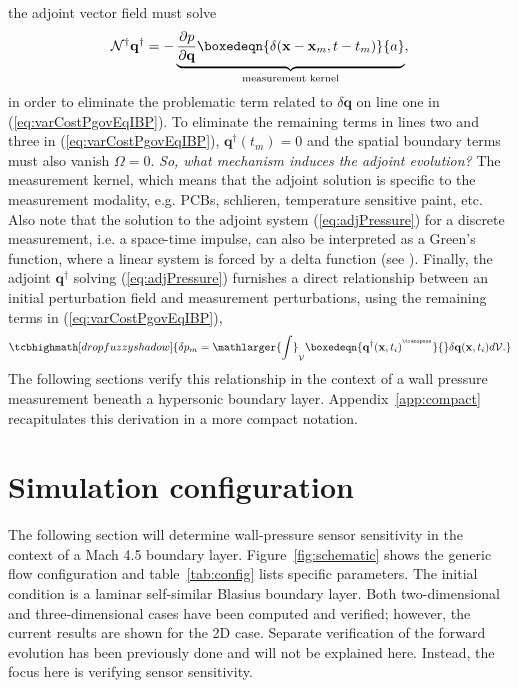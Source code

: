 the adjoint vector field must solve
\begin{equation}\label{eq:adjPressure}
    \mathcal{N}^\dagger \mathbf{q}^\dagger=-\underbrace{\frac{\partial p}{\partial \mathbf{q}} \boxedeqn{\delta(\mathbf{x}-\mathbf{x}_m,t-t_m)}{a}}_{\text{measurement kernel}},
\end{equation}
in order to eliminate the problematic term related to $\delta \mathbf{q}$ on line one in (\ref{eq:varCostPgovEqIBP}).  To eliminate the remaining terms in lines two and three in (\ref{eq:varCostPgovEqIBP}), $\mathbf{q}^\dagger(t_m)=0$ and the spatial boundary terms must also vanish $\Omega=0$. \textit{So, what mechanism induces the adjoint evolution?} The measurement kernel, which means that the adjoint solution is specific to the measurement modality, e.g. PCBs, schlieren, temperature sensitive paint, etc. Also note that the solution to the adjoint system (\ref{eq:adjPressure}) for a discrete measurement, i.e. a space-time impulse, can also be interpreted as a Green's function, where a linear system is forced by a delta function (see \citet{greenberg2015applications}). Finally, the adjoint $\mathbf{q}^\dagger$ solving (\ref{eq:adjPressure}) furnishes a direct relationship between an initial perturbation field and measurement perturbations, using the remaining terms in (\ref{eq:varCostPgovEqIBP}),
\begin{equation}\label{eq:predictdp}
\tcbhighmath[drop fuzzy shadow]{\delta p_m = \mathlarger{\int}_{\mathcal{V}} \boxedeqn{\mathbf{q}^\dagger(\mathbf{x},t_i)^{^\transpose}}{} \delta \mathbf{q}(\mathbf{x},t_i) d\mathcal{V}.}
\end{equation}
The following sections verify this relationship in the context of a wall pressure measurement beneath a hypersonic boundary layer. Appendix~\ref{app:compact} recapitulates this derivation in a more compact notation.







\section{Simulation configuration}\label{s:example}
The following section will determine wall-pressure sensor sensitivity in the context of a Mach 4.5 boundary layer. Figure~\ref{fig:schematic} shows the generic flow configuration and table~\ref{tab:config} lists specific parameters.  The initial condition is a laminar self-similar Blasius boundary layer.  Both two-dimensional and three-dimensional cases have been computed and verified; however, the current results are shown for the 2D case.  Separate verification of the forward evolution has been previously done and will not be explained here. Instead, the focus here is verifying sensor sensitivity.


